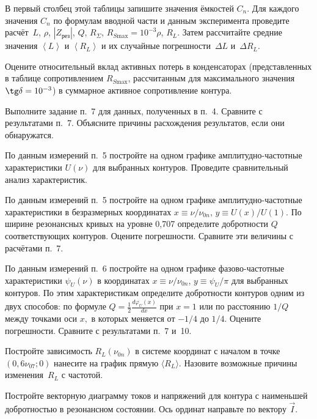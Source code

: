 \begin{lab:task}
В первый столбец этой таблицы запишите значения ёмкостей $C_n$. 
Для каждого значения $C_n$ по формулам вводной части и данным 
эксперимента проведите  расчёт~$L$, 
$\rho$, $|Z_{\text{рез}}|$, $Q$, $R_{\Sigma}$, 
$R_{S \text{max}}=10^{-3}\rho$, $R_L$.
Затем рассчитайте средние значения $\left< L \right>$ и $\left< R_L \right>$ 
и их случайные погрешности~$\Delta L$ и~$\Delta R_L$.


Оцените относительный вклад активных потерь в конденсаторах 
(представленных в таблице сопротивлением $R_{S\text{max}}$, рассчитанным для
максимального значения $\tg\delta=10^{-3}$) в суммарное активное сопротивление
контура.

\item *Выполните задание п.~7 для данных,
полученных в п.~4. Сравните с результатами п.~7. Объясните причины расхождения
результатов, если они обнаружатся.

\item По данным измерений п.~5 постройте на одном графике амплитудно-частотные
характеристики $U(\nu)$  для выбранных контуров. Проведите сравнительный 
анализ характеристик.

\item По данным измерений п.~5 постройте на одном графике амплитудно-частотные
характеристики в безразмерных координатах $x\equiv \nu/\nu_{0n}$, $y\equiv
U(x)/U(1).$ По ширине резонансных кривых на уровне 0,707 определите добротности
$Q$ соответствующих контуров. Оцените погрешности. Сравните эти величины с
расчётами п.~7.

\item По данным измерений п.~6 постройте на одном графике фазово-частотные
характеристики $\psi_U(\nu)$ в координатах $x\equiv \nu/\nu_{0n}$, $y\equiv\psi_U/\pi$
для выбранных контуров. По этим характеристикам определите добротности контуров
одним из двух способов: по формуле $Q=\frac12 \frac{d\varphi_U(x)}{dx}$ при $x=1$ или по
расстоянию $1/Q$ между точками оси $x,$ в которых  меняется от $-1/4$ до $1/4$. 
Оцените погрешности. Сравните с результатами п.~7 и~10.

\item Постройте зависимость $R_L(\nu_{0n})$ в системе координат с началом 
в точке $(0,6\nu_{07};0)$ нанесите на график прямую $\langle R_L \rangle$. 
Назовите возможные причины изменения~$R_L$ с частотой.

\item Постройте векторную диаграмму токов и напряжений для контура 
с наименьшей добротностью в резонансном состоянии. Ось ординат направьте по 
вектору $\vec{I}$.
\end{lab:task}


